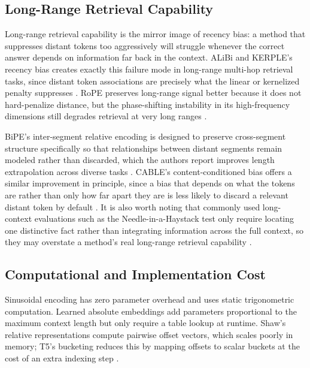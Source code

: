\documentclass[conference]{IEEEtran}
\begin{document}
\subsection{Long-Range Retrieval Capability}

Long-range retrieval capability is the mirror image of recency bias: a method that suppresses distant tokens too aggressively will struggle whenever the correct answer depends on information far back in the context. ALiBi and KERPLE's recency bias creates exactly this failure mode in long-range multi-hop retrieval tasks, since distant token associations are precisely what the linear or kernelized penalty suppresses \cite{press2022,chi2022}. RoPE preserves long-range signal better because it does not hard-penalize distance, but the phase-shifting instability in its high-frequency dimensions still degrades retrieval at very long ranges \cite{sun2022lex,chen2023}.

BiPE's inter-segment relative encoding is designed to preserve cross-segment structure specifically so that relationships between distant segments remain modeled rather than discarded, which the authors report improves length extrapolation across diverse tasks \cite{he2024bipe}. CABLE's content-conditioned bias offers a similar improvement in principle, since a bias that depends on what the tokens are rather than only how far apart they are is less likely to discard a relevant distant token by default \cite{veisi2025cable}. It is also worth noting that commonly used long-context evaluations such as the Needle-in-a-Haystack test only require locating one distinctive fact rather than integrating information across the full context, so they may overstate a method's real long-range retrieval capability \cite{zhao2024survey}.

\subsection{Computational and Implementation Cost}

Sinusoidal encoding has zero parameter overhead and uses static trigonometric computation. Learned absolute embeddings add parameters proportional to the maximum context length but only require a table lookup at runtime. Shaw's relative representations compute pairwise offset vectors, which scales poorly in memory; T5's bucketing reduces this by mapping offsets to scalar buckets at the cost of an extra indexing step \cite{shaw2018,raffel2020}.
\end{document}
